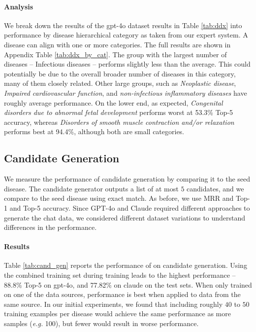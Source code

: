 \paragraph{Analysis}   We break down the results of the \methodname gpt-4o dataset results in Table \ref{tab:ddx} into performance by disease hierarchical category as taken from our expert system.  A disease can align with one or more categories. The full results are shown in Appendix Table \ref{tab:ddx_by_cat}.  The group with the largest number of diseases -- Infectious diseases -- performs slightly less than the average.  This could potentially be due to the overall broader number of diseases in this category, many of them closely related.  Other large groups, such as \textit{Neoplastic disease}, \textit{Impaired cardiovascular function}, and \textit{non-infectious inflammatory diseases} have roughly average performance.  On the lower end, as expected,  \textit{Congenital disorders due to abnormal fetal development} performs worst at 53.3\% Top-5 accuracy, whereas \textit{Disorders of smooth muscle contraction and/or relaxation} performs best at 94.4\%, although both are small categories.

\subsection{\methodname Candidate Generation}
\label{sec:eval_cand}
We measure the performance of \methodname candidate generation by comparing it to the seed disease. The candidate generator outputs a list  of at most $5$ candidates, and we compare to the seed disease using exact match. As before, we use  MRR and Top-1 and Top-5 accuracy.  Since GPT-4o and Claude required different approaches to generate the chat data, we considered different dataset variations to understand differences in the performance. 

\paragraph{Results} Table \ref{tab:cand_gen} reports the performance of \methodname on candidate generation.
Using the combined training set during training leads to the highest performance -- 88.8\% Top-5 on gpt-4o, and 77.82\% on claude on the test sets.   When only trained on one of the data sources,  performance is best when applied to data from the same source.   In our initial experiments, we found that including roughly $40$ to $50$ training examples per disease would achieve the same performance as more samples (\textit{e.g.} 100), but fewer would result in worse performance.  

